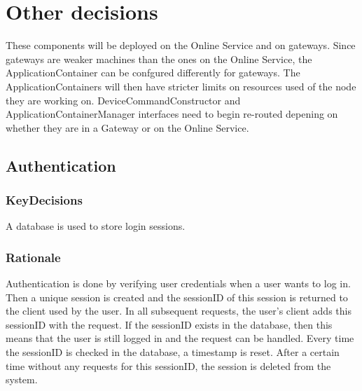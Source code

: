 
\showdecisionsnotes{}


\newpage

\newpage

\newpage

\newpage

\newpage

\newpage


\section{Other decisions}

            These components will be deployed on the Online Service and on gateways.
            Since gateways are weaker machines than the ones on the Online Service,
            the ApplicationContainer can be confgured differently for gateways.
            The ApplicationContainers will then have stricter limits on
            resources used of the node they are working on.
            DeviceCommandConstructor and ApplicationContainerManager interfaces need to begin
            re-routed depening on whether they are in a Gateway or on the Online Service.

    \subsection{Authentication}
        \subsubsection*{KeyDecisions}
            A database is used to store login sessions.

        \subsubsection*{Rationale}
            Authentication is done by verifying user credentials when a user wants to log in. Then a unique session
            is created and the sessionID of this session is returned to the client used by the user. In all subsequent requests,
            the user's client adds this sessionID with the request. If the sessionID exists in the database, then this means
            that the user is still logged in and the request can be handled. Every time the sessionID is checked in the database,
            a timestamp is reset. After a certain time without any requests for this sessionID, the session is deleted from the system. \\

